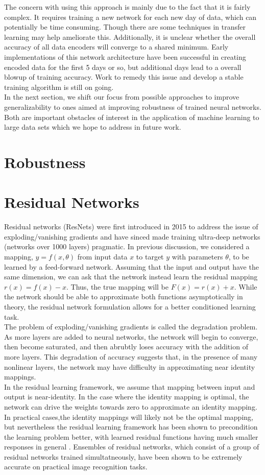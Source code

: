 \documentclass[12pt]{article}
\begin{document}
The concern with using this approach is mainly due to the fact that it is fairly complex. It requires training a new network for each new day of data, which can potentially be time consuming. Though there are some techniques in transfer learning may help ameliorate this. Additionally, it is unclear whether the overall accuracy of all data encoders will converge to a shared minimum. Early implementations of this network architecture have been successful in creating encoded data for the first 5 days or so, but additional days lead to a overall blowup of training accuracy. Work to remedy this issue and develop a stable training algorithm is still on going. \\
\indent In the next section, we shift our focus from possible approaches to improve generalizability to ones aimed at improving robustness of trained neural networks. Both are important obstacles of interest in the application of machine learning to large data sets which we hope to address in future work.
\section*{Robustness}
\section{Residual Networks}
Residual networks (ResNets) were first introduced in 2015 to address the issue of exploding/vanishing gradients and have sinced made training ultra-deep networks (networks over 1000 layers) pragmatic. In previous discussion, we considered a mapping, $y = f(x,\theta)$ from input data $x$ to target $y$ with parameters $\theta$, to be learned by a feed-forward network. Assuming that the input and output have the same dimension, we can ask that the network instead learn the residual mapping $r(x) = f(x)-x$. Thus, the true mapping will be $F(x) = r(x) + x$. While the network should be able to approximate both functions asymptotically in theory, the residual network formulation allows for a better conditioned learning task. \\
\indent The problem of exploding/vanishing gradients is called the degradation problem. As more layers are added to neural networks, the network will begin to converge, then become saturated, and then abrubtly loses accuracy with the addition of more layers. This degradation of accuracy suggests that, in the presence of many nonlinear layers, the network may have difficulty in approximating near identity mappings. \\
\indent In the residual learning framework, we assume that mapping between input and output is near-identity. In the case where the identity mapping is optimal, the network can drive the weights towards zero to approximate an identity mapping. In practical cases,the identity mappings will likely not be the optimal mapping, but nevertheless the residual learning framework has been shown to precondition the learning problem better, with learned residual functions having much smaller responses in general \cite{res}. Ensembles of residual networks, which consist of a group of residual networks trained simultatneously, have been shown to be extremely accurate on practical image recognition tasks.
\end{document}
